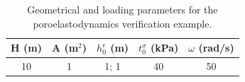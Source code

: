 \begin{table}[htb!]
\caption{
Material parameters for the poroelastodynamics verification example.}
\centering
{}
\label{tab:Examples_Verification_deBoer-Materials}
\end{table}

\begin{table}[htb!]
\renewcommand\thempfootnote{\arabic{mpfootnote}}
\begin{minipage}{\textwidth}
\caption{
Geometrical and loading parameters for the poroelastodynamics verification example.}
\centering
\begin{tabular}{|c|c|c|c|c|}
\hline
H (m) & A (m$^2$) & $h_0^e$ (m) & $t^\sigma_0$ (kPa) & $\omega$ (rad/s)\\
\hline \hline
10 & 1 & 1; 1 & 40 & 50\\
\hline
\end{tabular}
\label{tab:Examples_Verification_deBoer-Geometry}
\end{minipage}
\end{table}

